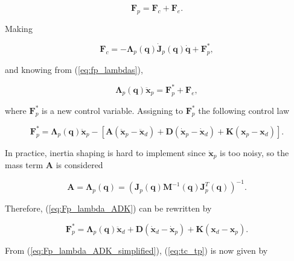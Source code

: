 \begin{equation}
    \boldsymbol{F}_p = \boldsymbol{F}_c + \boldsymbol{F}_e.
\end{equation}

Making 

\begin{equation}
    \boldsymbol{F}_c = -\boldsymbol{\Lambda}_p(\boldsymbol{q}) \boldsymbol{\dot{J}}_p(\boldsymbol{q}) \boldsymbol{\dot{q}} + \boldsymbol{F}^*_p ,
\end{equation}

and knowing from (\ref{eq:fp_lambdas}), 

\begin{equation}
    \boldsymbol{\Lambda}_p(\boldsymbol{q}) \boldsymbol{\ddot{x}}_p = \boldsymbol{F}^*_p + \boldsymbol{F}_e,
\end{equation}

where $\boldsymbol{F}^*_p$ is a new control variable. Assigning to $\boldsymbol{F}^*_p$ the following control law 

\begin{equation}
    \label{eq:Fp_lambda_ADK}
    \boldsymbol{F}^*_p = \boldsymbol{\Lambda}_p(\boldsymbol{q}) \boldsymbol{\ddot{x}}_p - [\boldsymbol{A}(\boldsymbol{\ddot{x}}_p - \boldsymbol{\ddot{x}}_d) + \boldsymbol{D}(\boldsymbol{\dot{x}}_p - \boldsymbol{\dot{x}}_d) + \boldsymbol{K}(\boldsymbol{x}_p  -\boldsymbol{x}_d)].
\end{equation}

In practice, inertia shaping is hard to implement since $\boldsymbol{\ddot{x}}_p$ is too noisy, so the mass term $\boldsymbol{A}$ is considered

\begin{equation}
    \boldsymbol{A} = \boldsymbol{\Lambda}_p(\boldsymbol{q}) = (\boldsymbol{J}_p(\boldsymbol{q}) \boldsymbol{M}^{-1}(\boldsymbol{q}) \boldsymbol{J}^T_p (\boldsymbol{q}))^{-1}.
\end{equation}

Therefore, (\ref{eq:Fp_lambda_ADK}) can be rewritten by

\begin{equation}
    \label{eq:Fp_lambda_ADK_simplified}
    \boldsymbol{F}^*_p = \boldsymbol{\Lambda}_p(\boldsymbol{q}) \boldsymbol{\ddot{x}}_d + \boldsymbol{D} (\boldsymbol{\dot{x}}_d - \boldsymbol{\dot{x}}_p) + \boldsymbol{K} (\boldsymbol{x}_d - \boldsymbol{x}_p).
\end{equation}

From (\ref{eq:Fp_lambda_ADK_simplified}), (\ref{eq:tc_tp}) is now given by

